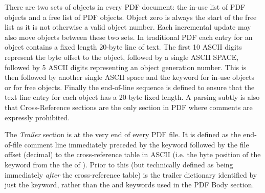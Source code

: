 There are two sets of
objects in every PDF document: the in-use list of PDF objects and a free list
of PDF objects. Object zero is always the start of the free list as it is not
otherwise a valid object number. Each incremental update may also move objects between these two sets.
In traditional PDF each entry for an object contains a fixed length 20-byte line of text.
The first 10 ASCII digits represent the byte offset to the object, followed by a single ASCII SPACE, 
followed by 5 ASCII digits representing an object generation number. This is then followed by
another single ASCII space and the keyword  for in-use objects or  for free objects.
Finally the end-of-line sequence is defined to ensure that the text line entry for each object has 
a 20-byte fixed length. A parsing subtly is also that Cross-Reference sections are the only section in PDF where comments are expressly prohibited.

The \emph{Trailer} section is at the very end of every PDF file. 
It is defined as the end-of-file comment line  immediately
preceded by the  keyword followed by the file offset (decimal) to 
the cross-reference table in ASCII (i.e. the byte position of the  keyword 
from the the \lstcd{\%} of ). Prior to this (but technically 
defined as being immediately \emph{after} the cross-reference table) is the trailer dictionary
identified by just the  keyword, rather than the  and 
keywords used in the PDF Body section.

